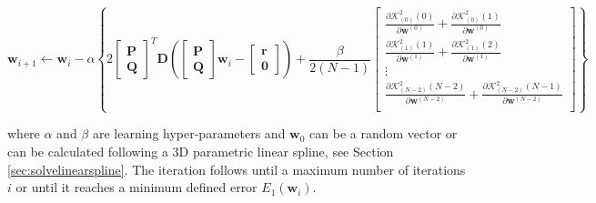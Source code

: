 \begin{equation}
\mathbf{w}_{i+1}
\leftarrow 
\mathbf{w}_{i}
-
\alpha
\left\{
2
\begin{bmatrix}
\mathbf{P}\\
\mathbf{Q}
\end{bmatrix}^{T}
\mathbf{D}
\left(
\begin{bmatrix}
\mathbf{P}\\
\mathbf{Q}
\end{bmatrix}
\mathbf{w}_{i}
-
\begin{bmatrix}
\mathbf{r}\\
\mathbf{0}
\end{bmatrix}
\right)
+
\frac{\beta}{2(N-1)}
\begin{bmatrix}
%
\frac{
\partial 
\mathcal{K}_{(0)}^{2}(0)
}{\partial \mathbf{w}^{(0)}}
+
\frac{
\partial 
\mathcal{K}_{(0)}^{2}(1)
}{\partial \mathbf{w}^{(0)}}\\[4pt]
%
\frac{
\partial 
\mathcal{K}_{(1)}^{2}(1)
}{\partial \mathbf{w}^{(1)}}
+
\frac{
\partial 
\mathcal{K}_{(1)}^{2}(2)
}{\partial \mathbf{w}^{(1)}}\\[4pt]
%
\vdots\\[4pt]
\frac{
\partial 
\mathcal{K}_{(N-2)}^{2}(N-2)
}{\partial \mathbf{w}^{(N-2)}}
+
\frac{
\partial 
\mathcal{K}_{(N-2)}^{2}(N-1)
}{\partial \mathbf{w}^{(N-2)}}\\
%
\end{bmatrix}
\right\}
\end{equation}

where $\alpha$ and $\beta$ are learning hyper-parameters and 
$\mathbf{w}_{0}$ can be a random vector or can
be calculated following a 3D parametric linear spline,
see Section \ref{sec:solvelinearspline}.
The iteration follows until a maximum number of iterations $i$ or until it reaches a
minimum defined error $E_1(\mathbf{w}_{i})$. 

